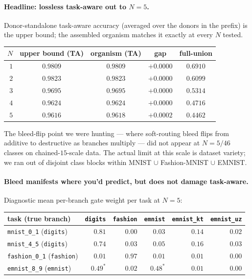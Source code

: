 \documentclass[11pt]{article}
\newcommand{\arm}[1]{\texttt{#1}}
\begin{document}
\paragraph{Headline: lossless task-aware out to $N = 5$.}
Donor-standalone task-aware accuracy (averaged over the donors in the
prefix) is the upper bound; the assembled organism matches it exactly
at every $N$ tested.

\begin{center}
\begin{tabular}{rcccc}
\toprule
$N$ & upper bound (TA) & organism (TA) & gap & full-union \\
\midrule
$1$ & $0.9809$ & $0.9809$ & $+0.0000$ & $0.6910$ \\
$2$ & $0.9823$ & $0.9823$ & $+0.0000$ & $0.6099$ \\
$3$ & $0.9695$ & $0.9695$ & $+0.0000$ & $0.5314$ \\
$4$ & $0.9624$ & $0.9624$ & $+0.0000$ & $0.4716$ \\
$5$ & $0.9616$ & $0.9618$ & $+0.0002$ & $0.4462$ \\
\bottomrule
\end{tabular}
\end{center}

The bleed-flip point we were hunting --- where soft-routing bleed flips
from additive to destructive as branches multiply --- did not appear at
$N = 5 / 46$ classes on chained-$15$-scale data. The actual limit at
this scale is dataset variety; we ran out of disjoint class blocks
within MNIST $\cup$ Fashion-MNIST $\cup$ EMNIST.

\paragraph{Bleed manifests where you'd predict, but does not damage
task-aware.} Diagnostic mean per-branch gate weight per task at
$N = 5$:

\begin{center}
\begin{tabular}{lrrrrr}
\toprule
task (true branch) & \arm{digits} & \arm{fashion} & \arm{emnist} & \arm{emnist\_kt} & \arm{emnist\_uz} \\
\midrule
\texttt{mnist\_0\_1} (\arm{digits}) & $0.81$ & $0.00$ & $0.03$ & $0.14$ & $0.02$ \\
\texttt{mnist\_4\_5} (\arm{digits}) & $0.74$ & $0.03$ & $0.05$ & $0.16$ & $0.03$ \\
\texttt{fashion\_0\_1} (\arm{fashion}) & $0.01$ & $0.97$ & $0.01$ & $0.01$ & $0.00$ \\
\texttt{emnist\_8\_9} (\arm{emnist}) & $0.49^*$ & $0.02$ & $0.48^*$ & $0.01$ & $0.00$ \\
\bottomrule
\end{tabular}
\end{center}
\end{document}
